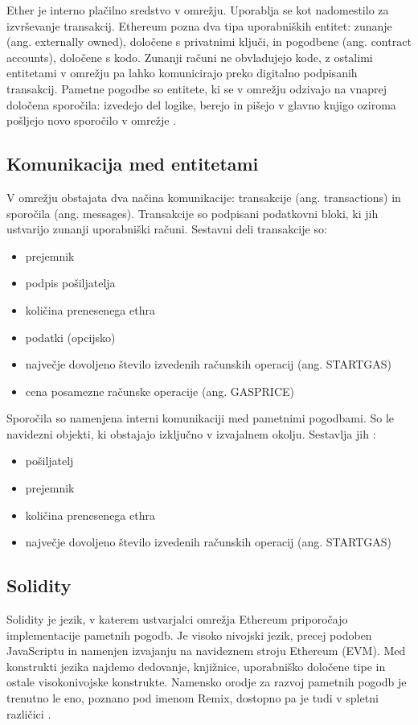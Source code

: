 \documentclass[a4paper, 12pt]{book}
\begin{document}
Ether je interno plačilno sredstvo v omrežju.
Uporablja se kot nadomestilo za izvrševanje transakcij.
Ethereum pozna dva tipa uporabniških entitet: zunanje (ang. externally owned), določene s privatnimi ključi, in pogodbene (ang. contract accounts), določene s kodo.
Zunanji računi ne obvladujejo kode, z ostalimi entitetami v omrežju pa lahko komunicirajo preko digitalno podpisanih transakcij.
Pametne pogodbe so entitete, ki se v omrežju odzivajo na vnaprej določena sporočila: izvedejo del logike, berejo in pišejo v glavno knjigo oziroma pošljejo novo sporočilo v omrežje \cite{ethereumWhitepaper}.

\subsection{Komunikacija med entitetami}
V omrežju obstajata dva načina komunikacije: transakcije (ang. transactions) in sporočila (ang. messages).
Transakcije so podpisani podatkovni bloki, ki jih ustvarijo zunanji uporabniški računi.
Sestavni deli transakcije so:
\begin{itemize}
	\item prejemnik
	\item podpis pošiljatelja
	\item količina prenesenega ethra
	\item podatki (opcijsko)
	\item največje dovoljeno število izvedenih računskih operacij (ang. STARTGAS)
	\item cena posamezne računske operacije (ang. GASPRICE)
\end{itemize}

Sporočila so namenjena interni komunikaciji med pametnimi pogodbami.
So le navidezni objekti, ki obstajajo izključno v izvajalnem okolju.
Sestavlja jih \cite{ethereumWhitepaper}:
\begin{itemize}
	\item pošiljatelj
	\item prejemnik
	\item količina prenesenega ethra
	\item največje dovoljeno število izvedenih računskih operacij (ang. STARTGAS)
\end{itemize}

\subsection{Solidity}
Solidity je jezik, v katerem ustvarjalci omrežja Ethereum priporočajo implementacije pametnih pogodb.
Je visoko nivojski jezik, precej podoben JavaScriptu in namenjen izvajanju na navideznem stroju Ethereum (EVM).
Med konstrukti jezika najdemo dedovanje, knjižnice, uporabniško določene tipe in ostale visokonivojske konstrukte.
Namensko orodje za razvoj pametnih pogodb je trenutno le eno, poznano pod imenom Remix, dostopno pa je tudi v spletni različici
\cite{solidityDocs}.
\end{document}
